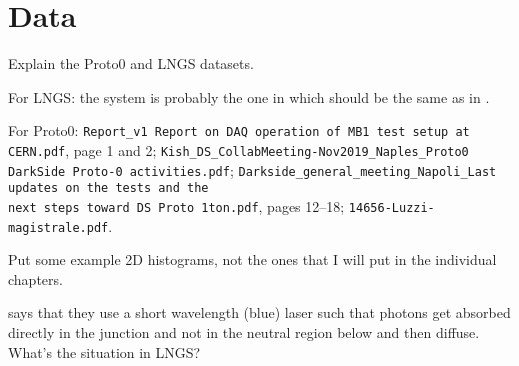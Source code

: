 \chapter{Data}
\label{ch:data}

Explain the Proto0 and LNGS datasets.

For LNGS: the system is probably the one in \cite{savarese2018} which should be
the same as in \cite{acerbi2017}.

For Proto0: \nolinkurl{Report_v1 Report on DAQ operation of MB1 test setup at
CERN.pdf}, page 1 and 2; \nolinkurl{Kish_DS_CollabMeeting-Nov2019_Naples_Proto0
DarkSide Proto-0 activities.pdf};
\nolinkurl{Darkside_general_meeting_Napoli_Last updates on the tests and the
next steps toward DS Proto 1ton.pdf}, pages 12--18;
\nolinkurl{14656-Luzzi-magistrale.pdf}.

Put some example 2D histograms, not the ones that I will put in the individual
chapters.

\cite[p.~2, after eq.~5]{nagy2014} says that they use a short wavelength (blue)
laser such that photons get absorbed directly in the junction and not in the
neutral region below and then diffuse. What's the situation in LNGS?
